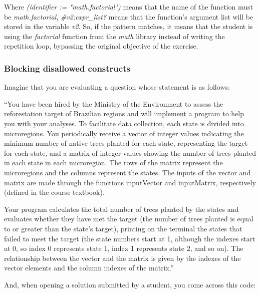 Where \textit{(identifier := "math.factorial")} means that the name of the 
function must be \textit{math.factorial}, \textit{\#v2:expr\_list?} means 
that the function's argument list will be stored in the variable \textit{v2}.
So, if the pattern matches, it means that the student is using the 
\textit{factorial} function from the \textit{math} library instead of writing 
the repetition loop, bypassing the original objective of the exercise.


\subsubsection{Blocking disallowed constructs}
    
Imagine that you are evaluating a question whose statement is as follows:

``You have been hired by the Ministry of the Environment to assess the reforestation 
target of Brazilian regions and will implement a program to help you with your analyses. 
To facilitate data collection, each state is divided into microregions. 
You periodically receive a vector of integer values indicating the minimum number 
of native trees planted for each state, representing the target for each state, 
and a matrix of integer values showing the number of trees planted in each state 
in each microregion. The rows of the matrix represent the microregions and the 
columns represent the states. The inputs of the vector and matrix are made through 
the functions inputVector and inputMatrix, respectively (defined in the course textbook).

Your program calculates the total number of trees planted by the states and 
evaluates whether they have met the target (the number of trees planted is equal 
to or greater than the state's target), printing on the terminal the states that 
failed to meet the target (the state numbers start at 1, although the indexes 
start at 0, so index 0 represents state 1, index 1 represents state 2, and so on). 
The relationship between the vector and the matrix is given by the indexes of the 
vector elements and the column indexes of the matrix.''

And, when opening a solution submitted by a student, you come across this code:

